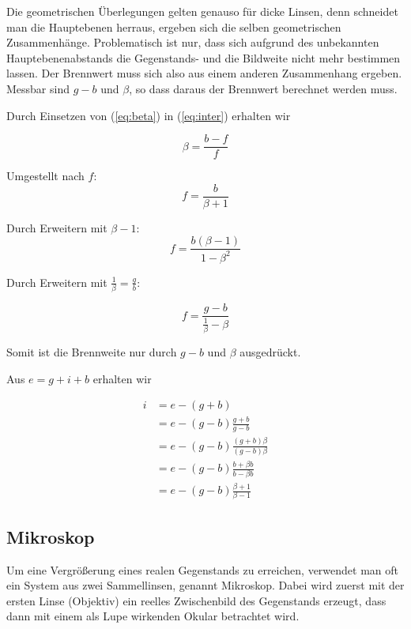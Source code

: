 \documentclass[a4paper,german,12pt,smallheadings]{scrartcl}
\begin{document}
Die geometrischen Überlegungen gelten genauso für dicke Linsen, denn schneidet
man die Hauptebenen herraus, ergeben sich die selben geometrischen
Zusammenhänge.  Problematisch ist nur, dass sich aufgrund des unbekannten
Hauptebenenabstands die Gegenstands- und die Bildweite nicht mehr bestimmen
lassen. Der Brennwert muss sich also aus einem anderen Zusammenhang ergeben.
Messbar sind $g-b$ und $\beta$, so dass daraus der Brennwert berechnet werden
muss.

Durch Einsetzen von (\ref{eq:beta}) in (\ref{eq:inter}) erhalten wir

\begin{equation}
  \beta = \frac{b-f}{f}
\end{equation}

Umgestellt nach $f$:
\begin{equation}
  f = \frac{b}{\beta + 1}
\end{equation}

Durch Erweitern mit $\beta - 1$:
\begin{equation}
  f = \frac{b(\beta - 1)}{1-\beta^2}
\end{equation}

Durch Erweitern mit $\frac{1}{\beta} = \frac{g}{b}$:

\begin{equation}
  f = \frac{g - b}{\frac{1}{\beta} - \beta}
  \label{eq:dickebrennweite}
\end{equation}

Somit ist die Brennweite nur durch $g-b$ und $\beta$ ausgedrückt.

Aus $e = g + i + b$ erhalten wir

\begin{align*}
  i &= e - (g+b) \\
    &= e - (g-b) \frac{g+b}{g-b} \\
    &= e - (g-b) \frac{(g+b)\beta}{(g-b)\beta} \\
    &= e - (g-b) \frac{b + \beta b}{b - \beta b} \\
    &= e - (g-b) \frac{\beta + 1}{\beta - 1}
\end{align*}

\subsection{Mikroskop}
Um eine Vergrößerung eines realen Gegenstands zu erreichen, verwendet man oft
ein System aus zwei Sammellinsen, genannt Mikroskop. Dabei wird zuerst mit der
ersten Linse (Objektiv) ein reelles Zwischenbild des Gegenstands erzeugt, dass
dann mit einem als Lupe wirkenden Okular betrachtet wird.
\end{document}
